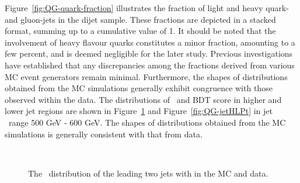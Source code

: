 Figure~\ref{fig:QG-quark-fraction} illustrates the fraction of light and heavy quark- and gluon-jets in the  dijet sample. These fractions are depicted in a stacked format, summing up to a cumulative value of 1. It should be noted that the involvement of heavy flavour quarks constitutes a minor fraction, amounting to a few percent, and is deemed negligible for the later study.
Previous investigations~\cite{ref21} have established that any discrepancies among the fractions derived from various MC event generators remain minimal. Furthermore, the shapes of distributions obtained from the MC simulations generally exhibit congruence with those observed within the  data.
The distributions of \ntrk~and BDT score in higher and lower jet regions are shown in Figure~\ref{fig:QG-ntrk-method1} and Figure~\ref{fig:QG-jetHLPt} in jet \pt~range 500 GeV - 600 GeV. The shapes of distributions obtained from the MC simulations is generally consistent with that from data.

\begin{figure}[htb]
	\centering
	 \quad
	\\
	\caption[]{
	  The \ntrk~distribution of the leading two jets with {} in the MC and data.
		\label{fig:QG-ntrk-method1}
	}
\end{figure}

